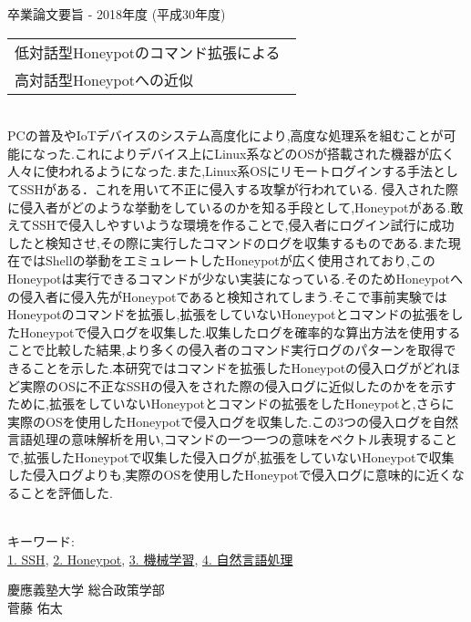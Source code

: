 卒業論文要旨 - 2018年度 (平成30年度)
\begin{center}
\begin{large}
\begin{tabular}{|M{0.97\linewidth}|}
    \hline
   低対話型Honeypotのコマンド拡張による\\高対話型Honeypotへの近似\\
    \hline
\end{tabular}
\end{large}
\end{center}

~ \\

PCの普及やIoTデバイスのシステム高度化により,高度な処理系を組むことが可能になった.これによりデバイス上にLinux系などのOSが搭載された機器が広く人々に使われるようになった.また,Linux系OSにリモートログインする手法としてSSHがある．これを用いて不正に侵入する攻撃が行われている.
侵入された際に侵入者がどのような挙動をしているのかを知る手段として,Honeypotがある.敢えてSSHで侵入しやすいような環境を作ることで,侵入者にログイン試行に成功したと検知させ,その際に実行したコマンドのログを収集するものである.また現在ではShellの挙動をエミュレートしたHoneypotが広く使用されており,このHoneypotは実行できるコマンドが少ない実装になっている.そのためHoneypotへの侵入者に侵入先がHoneypotであると検知されてしまう.そこで事前実験ではHoneypotのコマンドを拡張し,拡張をしていないHoneypotとコマンドの拡張をしたHoneypotで侵入ログを収集した.収集したログを確率的な算出方法を使用することで比較した結果,より多くの侵入者のコマンド実行ログのパターンを取得できることを示した.本研究ではコマンドを拡張したHoneypotの侵入ログがどれほど実際のOSに不正なSSHの侵入をされた際の侵入ログに近似したのかをを示すために,拡張をしていないHoneypotとコマンドの拡張をしたHoneypotと,さらに実際のOSを使用したHoneypotで侵入ログを収集した.この3つの侵入ログを自然言語処理の意味解析を用い,コマンドの一つ一つの意味をベクトル表現することで,拡張したHoneypotで収集した侵入ログが,拡張をしていないHoneypotで収集した侵入ログよりも,実際のOSを使用したHoneypotで侵入ログに意味的に近くなることを評価した.


~ \\
キーワード:\\
\underline{1. SSH},
\underline{2. Honeypot},
\underline{3. 機械学習},
\underline{4. 自然言語処理}
\begin{flushright}
慶應義塾大学 総合政策学部\\
菅藤 佑太
\end{flushright}
